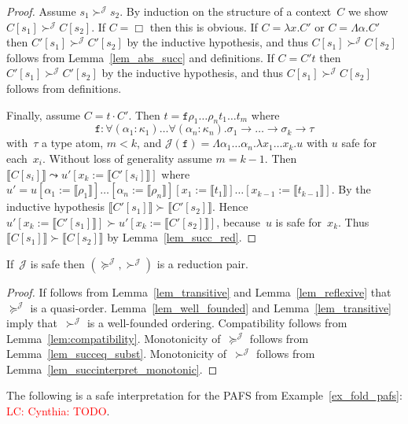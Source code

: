 \documentclass[a4paper,UKenglish,cleveref,autoref,numberwithinsect]{lipics-v2019}
\theoremstyle{definition}
\newcommand{\arrtype}{\rightarrow}
\newcommand{\app}[2]{#1 \cdot #2}
\newcommand{\subst}[2]{#1:=#2}
\newcommand{\abs}[2]{\lambda #1.#2}
\newcommand{\tabs}[2]{\Lambda #1.#2}
\newcommand{\typeinterpret}[1]{\llbracket #1 \rrbracket}
\newcommand{\interpret}[1]{\llbracket #1 \rrbracket}
\newcommand{\Termmap}{\mathcal{J}}
\newcommand{\succinterpret}{\succ^{\Termmap}}
\newcommand{\succeqinterpret}{\succeq^{\Termmap}}
\newcommand{\LC}[1]{\textcolor{red}{LC: #1}}
\begin{document}
\begin{proof}
  Assume $s_1 \succinterpret s_2$. By induction on the structure of a
  context~$C$ we show $C[s_1] \succinterpret C[s_2]$. If $C=\Box$ then
  this is obvious. If $C = \abs{x}{C'}$ or $C = \tabs{\alpha}{C'}$
  then $C'[s_1] \succinterpret C'[s_2]$ by the inductive hypothesis,
  and thus $C[s_1] \succinterpret C[s_2]$ follows from
  Lemma~\ref{lem_abs_succ} and definitions. If $C = C' t$ then
  $C'[s_1] \succinterpret C'[s_2]$ by the inductive hypothesis, and
  thus $C[s_1] \succinterpret C[s_2]$ follows from definitions.

  Finally, assume $C = \app{t}{C'}$. Then $t = \mathtt{f} \rho_1
  \ldots \rho_n t_1 \ldots t_m$ where
  \[
  \mathtt{f} : \forall (\alpha_1 : \kappa_1) \ldots \forall (\alpha_n
  : \kappa_n) . \sigma_1 \arrtype \ldots \arrtype \sigma_k \arrtype
  \tau
  \]
  with~$\tau$ a type atom, $m < k$, and $\Termmap(\mathtt{f}) =
  \tabs{\alpha_1 \dots \alpha_n}{\abs{x_1 \dots x_k}{u}}$ with $u$
  safe for each~$x_i$. Without loss of generality assume $m=k-1$. Then
  $\interpret{C[s_i]} \leadsto u'[\subst{x_k}{\interpret{C'[s_i]}}]$
  where
  $u'=u[\subst{\alpha_1}{\typeinterpret{\rho_1}}]\ldots[\subst{\alpha_n}{\typeinterpret{\rho_n}}][\subst{x_1}{\interpret{t_1}}]\ldots[\subst{x_{k-1}}{\interpret{t_{k-1}}}]$. By
  the inductive hypothesis $\interpret{C'[s_1]} \succ
  \interpret{C'[s_2]}$. Hence $u'[\subst{x_k}{\interpret{C'[s_1]}}]
  \succ u'[\subst{x_k}{\interpret{C'[s_2]}}]$, because~$u$ is safe
  for~$x_k$. Thus $\interpret{C[s_1]} \succ \interpret{C[s_2]}$ by
  Lemma~\ref{lem_succ_red}.
\end{proof}

\begin{theorem}\label{thm_reduction_pair}
  If~$\Termmap$ is safe then $(\succeqinterpret,\succinterpret)$ is a
  reduction pair.
\end{theorem}

\begin{proof}
  If follows from Lemma~\ref{lem_transitive} and
  Lemma~\ref{lem_reflexive} that~$\succeqinterpret$ is a
  quasi-order. Lemma~\ref{lem_well_founded} and
  Lemma~\ref{lem_transitive} imply that~$\succinterpret$ is a
  well-founded ordering. Compatibility follows from
  Lemma~\ref{lem:compatibility}. Monotonicity of~$\succeqinterpret$
  follows from Lemma~\ref{lem_succeq_subst}. Monotonicity
  of~$\succinterpret$ follows from
  Lemma~\ref{lem_succinterpret_monotonic}.
\end{proof}

\begin{example}\label{ex_fold_interpretation}
  The following is a safe interpretation for the PAFS from
  Example~\ref{ex_fold_pafs}: \LC{Cynthia: TODO}.
\end{example}
\end{document}
